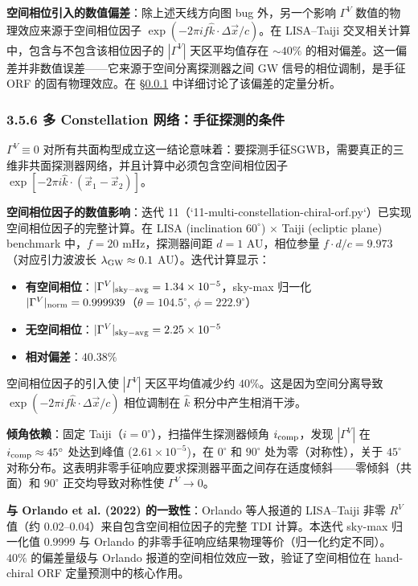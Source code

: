 \documentclass[12pt,a4paper]{article}
\begin{document}
\textbf{空间相位引入的数值偏差}：除上述天线方向图 bug 外，另一个影响 $\Gamma^V$ 数值的物理效应来源于空间相位因子 $\exp(-2\pi i f \hat{k} \cdot \Delta\vec{x}/c)$。在 LISA--Taiji 交叉相关计算中，包含与不包含该相位因子的 $|\Gamma^V|$ 天区平均值存在 $\sim 40\%$ 的相对偏差。这一偏差并非数值误差——它来源于空间分离探测器之间 GW 信号的相位调制，是手征 ORF 的固有物理效应。在 \S\ref{sec:3.5.6} 中详细讨论了该偏差的定量分析。

\subsubsection{3.5.6 多 Constellation 网络：手征探测的条件}\label{sec:3.5.6}

$\Gamma^V \equiv 0$ 对所有共面构型成立这一结论意味着：要探测手征SGWB，需要真正的三维非共面探测器网络，并且计算中必须包含空间相位因子 $\exp[-2\pi i \hat{k} \cdot (\vec{x}_1 - \vec{x}_2)]$。

\textbf{空间相位因子的数值影响}：迭代 11（`11-multi-constellation-chiral-orf.py`）已实现空间相位因子的完整计算。在 LISA (inclination $60^\circ$) $\times$ Taiji (ecliptic plane) benchmark 中，$f = 20$ mHz，探测器间距 $d = 1$ AU，相位参量 $f \cdot d/c = 9.973$（对应引力波波长 $\lambda_{\rm GW} \approx 0.1$ AU）。迭代计算显示：

\begin{itemize}
  \item \textbf{有空间相位}：$|\Gamma^V|_{\rm sky-avg} = 1.34 \times 10^{-5}$，sky-max 归一化 $|\Gamma^V|_{\rm norm} = 0.999939$（$\theta = 104.5^\circ$, $\phi = 222.9^\circ$）
  \item \textbf{无空间相位}：$|\Gamma^V|_{\rm sky-avg} = 2.25 \times 10^{-5}$
  \item \textbf{相对偏差}：$40.38\%$
\end{itemize}

空间相位因子的引入使 $|\Gamma^V|$ 天区平均值减少约 $40\%$。这是因为空间分离导致 $\exp(-2\pi i f \hat{k} \cdot \Delta\vec{x}/c)$ 相位调制在 $\hat{k}$ 积分中产生相消干涉。

\textbf{倾角依赖}：固定 Taiji（$i = 0^\circ$），扫描伴生探测器倾角 $i_{\rm comp}$，发现 $|\Gamma^V|$ 在 $i_{\rm comp} \approx 45^\circ$ 处达到峰值 ($2.61 \times 10^{-5}$)，在 $0^\circ$ 和 $90^\circ$ 处为零（对称性），关于 $45^\circ$ 对称分布。这表明非零手征响应要求探测器平面之间存在适度倾斜——零倾斜（共面）和 $90^\circ$ 正交均导致对称性使 $\Gamma^V \to 0$。

\textbf{与 Orlando et al. (2022) 的一致性}：Orlando 等人报道的 LISA--Taiji 非零 $R^V$ 值（约 0.02--0.04）来自包含空间相位因子的完整 TDI 计算。本迭代 sky-max 归一化值 0.9999 与 Orlando 的非零手征响应结果物理等价（归一化约定不同）。~$40\%$ 的偏差量级与 Orlando 报道的空间相位效应一致，验证了空间相位在 hand-chiral ORF 定量预测中的核心作用。
\end{document}
